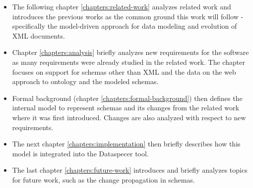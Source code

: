 \begin{itemize}\setlength{\itemsep}{1pt}
    \item The following chapter \ref{chapters:related-work} analyzes related work and introduces the previous works as the common ground this work will follow - specifically the model-driven approach for data modeling and evolution of XML documents.
    \item Chapter \ref{chapters:analysis} briefly analyzes new requirements for the software as many requirements were already studied in the related work. The chapter focuses on support for schemas other than XML and the data on the web \cite{data-on-the-web} approach to ontology and the modeled schemas.
    \item Formal background (chapter \ref{chapters:formal-background}) then defines the internal model to represent schemas and its changes from the related work where it was first introduced. Changes are also analyzed with respect to new requirements.
    \item The next chapter \ref{chapters:implementation} then briefly describes how this model is integrated into the Dataspecer tool.
    \item The last chapter \ref{chapters:future-work} introduces and briefly analyzes topics for future work, such as the change propagation in schemas.
\end{itemize}

